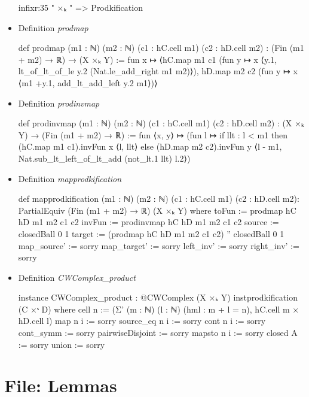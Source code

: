 \documentclass[colorinlistoftodos]{article}
\begin{document}
\begin{itemize}
\begin{leancode}
infixr:35 " ×ₖ "  => Prodkification
\end{leancode}
  \item Definition \emph{prodmap} 
\begin{leancode}
def prodmap (m1 : ℕ) (m2 : ℕ) (c1 : hC.cell m1) (c2 : hD.cell m2) : 
(Fin (m1 + m2) → ℝ) → (X ×ₖ Y) := 
fun x ↦ ⟨hC.map m1 c1 (fun y ↦ x ⟨y.1, lt_of_lt_of_le y.2 (Nat.le_add_right m1 m2)⟩), 
hD.map m2 c2 (fun y ↦ x ⟨m1 +y.1, add_lt_add_left y.2 m1⟩)⟩
\end{leancode}
  \item Definition \emph{prodinvmap}
\begin{leancode}
def prodinvmap (m1 : ℕ) (m2 : ℕ) (c1 : hC.cell m1) (c2 : hD.cell m2) : 
(X ×ₖ Y) → (Fin (m1 + m2) → ℝ) := 
fun ⟨x, y⟩ ↦ (fun l ↦ if llt : l < m1 then (hC.map m1 c1).invFun x ⟨l, llt⟩ 
else (hD.map m2 c2).invFun y ⟨l - m1, Nat.sub_lt_left_of_lt_add (not_lt.1 llt) l.2⟩)
\end{leancode}
  \item Definition \emph{mapprodkification} 
\begin{leancode}
def mapprodkification (m1 : ℕ) (m2 : ℕ) (c1 : hC.cell m1) (c2 : hD.cell m2):
  PartialEquiv (Fin (m1 + m2) → ℝ) (X ×ₖ Y) where
    toFun :=  prodmap hC hD m1 m2 c1 c2
    invFun := prodinvmap hC hD m1 m2 c1 c2
    source := closedBall 0 1
    target := (prodmap hC hD m1 m2 c1 c2) '' closedBall 0 1
    map_source' := sorry
    map_target' := sorry
    left_inv' := sorry
    right_inv' := sorry
\end{leancode}
  \item Definition \emph{CWComplex\_product} 
\begin{leancode}
instance CWComplex_product : @CWComplex (X ×ₖ Y) instprodkification (C ×ˢ D) where
  cell n := (Σ' (m : ℕ) (l : ℕ) (hml : m + l = n), hC.cell m × hD.cell l)
  map n i := sorry
  source_eq n i := sorry
  cont n i := sorry
  cont_symm := sorry
  pairwiseDisjoint := sorry
  mapsto n i := sorry
  closed A := sorry
  union := sorry
\end{leancode}
\end{itemize}

\section{File: Lemmas}
\end{document}
